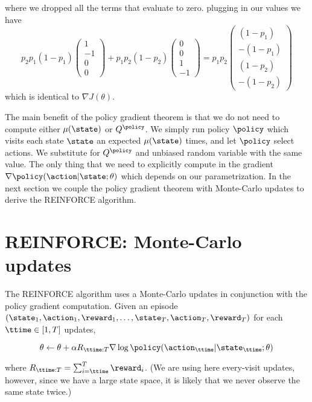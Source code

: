 \begin{example}
where we dropped all the terms that evaluate to zero. plugging in
our values we have
\[
p_2 p_1 (1-p_1)\begin{pmatrix}1\\-1\\0\\0\end{pmatrix} + p_1 p_2
(1-p_2)\begin{pmatrix}0\\0\\1\\-1\end{pmatrix} = p_1 p_2\begin{pmatrix}(1-p_1)\\
-(1-p_1) \\  (1-p_2) \\ - (1-p_2)\end{pmatrix}
\]
which is identical to $\nabla J(\theta)$.
\end{example}


The main benefit of the policy gradient theorem is that we do not
need to compute either $\mu(\state)$ or $Q^\policy$. We simply run
policy $\policy$ which visits each state $\state$ an expected
 $\mu(\state)$ times, and let $\policy$ select
actions. We substitute for $Q^\policy$ and unbiased random variable
with the same value. The only thing that we need to explicitly
compute in the gradient $\nabla \policy(\action|\state;\theta)$
which depends on our parametrization. In the next section we couple
the policy gradient theorem with Monte-Carlo updates to derive the
REINFORCE algorithm.


\section{REINFORCE: Monte-Carlo updates}

The REINFORCE algorithm uses a Monte-Carlo updates in conjunction
with the policy gradient computation. Given an episode
$(\state_1,\action_1,\reward_1, \ldots ,
\state_T,\action_T,\reward_T)$ for each $\ttime\in [1,T]$ updates,

\[
\theta\leftarrow \theta+\alpha R_{\ttime:T} \nabla \log
\policy(\action_\ttime|\state_\ttime;\theta)
\]

where $R_{\ttime:T}=\sum_{i=\ttime}^T \reward_i$. (We are using here
every-visit updates, however, since we have a large state space, it
is likely that we never observe the same state twice.)


